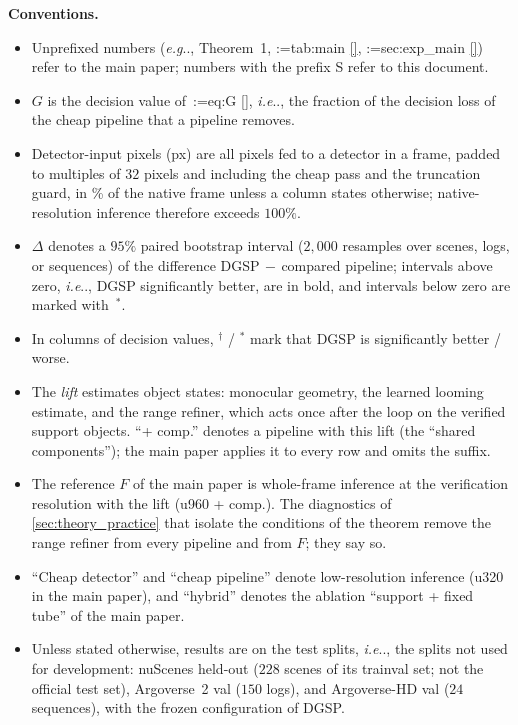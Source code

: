 \documentclass[10pt,letterpaper]{article}
\makeatletter
\DeclareRobustCommand\onedot{\futurelet\@let@token\@onedot}
\def\@onedot{\ifx\@let@token.\else.\null\fi\xspace}
\def\eg{\emph{e.g}\onedot} \def\Eg{\emph{E.g}\onedot}
\def\ie{\emph{i.e}\onedot} \def\Ie{\emph{I.e}\onedot}
\newcommand{\method}{DGSP\xspace}
\newcommand{\full}{F}
\newcommand{\G}{G}
\newcommand{\sw}{$^{\ast}$}   %
\theoremstyle{remark}
\theoremstyle{plain}
\theoremstyle{definition}
\DeclareRobustCommand{\mref}[1]{\def\mref@list{}\@for\mref@i:=#1\do{\ifx\mref@list\@empty\edef\mref@list{M-\mref@i}\else\edef\mref@list{\mref@list,M-\mref@i}\fi}%
  \edef\mref@cmd{\noexpand\cref*{\mref@list}}\mref@cmd}
\makeatother
\begin{document}
\smallskip\noindent\textbf{Conventions.}
\begin{itemize}[leftmargin=12pt, itemsep=1pt, topsep=2pt]
\item Unprefixed numbers (\eg, Theorem~1, \mref{tab:main}, \mref{sec:exp_main}) refer to the main paper; numbers with the prefix S refer to this document.
\item $\G$ is the decision value of~\mref{eq:G}, \ie, the fraction of the decision loss of the cheap pipeline that a pipeline removes.
\item Detector-input pixels (px) are all pixels fed to a detector in a frame, padded to multiples of $32$ pixels and including the cheap pass and the truncation guard, in \% of the native frame unless a column states otherwise; native-resolution inference therefore exceeds $100\%$.
\item $\Delta$ denotes a $95\%$ paired bootstrap interval ($2{,}000$ resamples over scenes, logs, or sequences) of the difference \method$\,-\,$compared pipeline; intervals above zero, \ie, \method significantly better, are in bold, and intervals below zero are marked with~\sw.
\item In columns of decision values, $^{\dagger}$ / $^{\ast}$ mark that \method is significantly better / worse.
\item The \emph{lift} estimates object states: monocular geometry, the learned looming estimate, and the range refiner, which acts once after the loop on the verified support objects. ``+ comp.'' denotes a pipeline with this lift (the ``shared components''); the main paper applies it to every row and omits the suffix.
\item The reference $\full$ of the main paper is whole-frame inference at the verification resolution with the lift (u960 + comp.). The diagnostics of \cref{sec:theory_practice} that isolate the conditions of the theorem remove the range refiner from every pipeline and from $\full$; they say so.
\item ``Cheap detector'' and ``cheap pipeline'' denote low-resolution inference (u320 in the main paper), and ``hybrid'' denotes the ablation ``support + fixed tube'' of the main paper.
\item Unless stated otherwise, results are on the test splits, \ie, the splits not used for development: nuScenes held-out ($228$ scenes of its trainval set; not the official test set), Argoverse~2 val ($150$ logs), and Argoverse-HD val ($24$ sequences), with the frozen configuration of \method.
\end{itemize}
\end{document}
